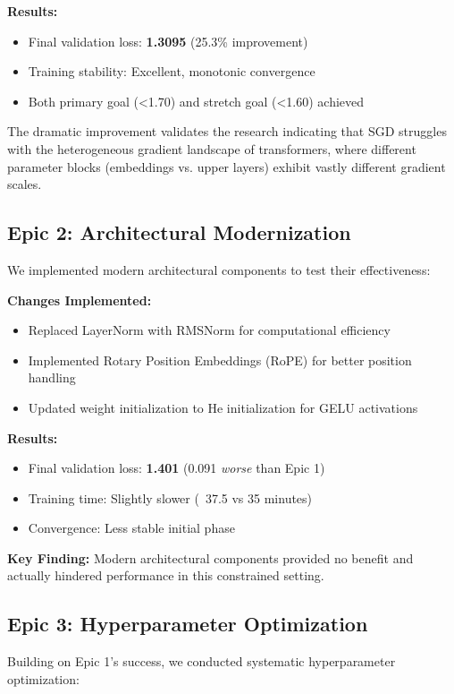 \documentclass[11pt,a4paper]{article}
\begin{document}
\textbf{Results:}
\begin{itemize}
    \item Final validation loss: \textbf{1.3095} (25.3\% improvement)
    \item Training stability: Excellent, monotonic convergence
    \item Both primary goal (<1.70) and stretch goal (<1.60) achieved
\end{itemize}

The dramatic improvement validates the research indicating that SGD struggles with the heterogeneous gradient landscape of transformers, where different parameter blocks (embeddings vs. upper layers) exhibit vastly different gradient scales.

\subsection{Epic 2: Architectural Modernization}
We implemented modern architectural components to test their effectiveness:

\textbf{Changes Implemented:}
\begin{itemize}
    \item Replaced LayerNorm with RMSNorm for computational efficiency
    \item Implemented Rotary Position Embeddings (RoPE) for better position handling
    \item Updated weight initialization to He initialization for GELU activations
\end{itemize}

\textbf{Results:}
\begin{itemize}
    \item Final validation loss: \textbf{1.401} (0.091 \textit{worse} than Epic 1)
    \item Training time: Slightly slower (~37.5 vs 35 minutes)
    \item Convergence: Less stable initial phase
\end{itemize}

\textbf{Key Finding:} Modern architectural components provided no benefit and actually hindered performance in this constrained setting.

\subsection{Epic 3: Hyperparameter Optimization}
Building on Epic 1's success, we conducted systematic hyperparameter optimization:
\end{document}
